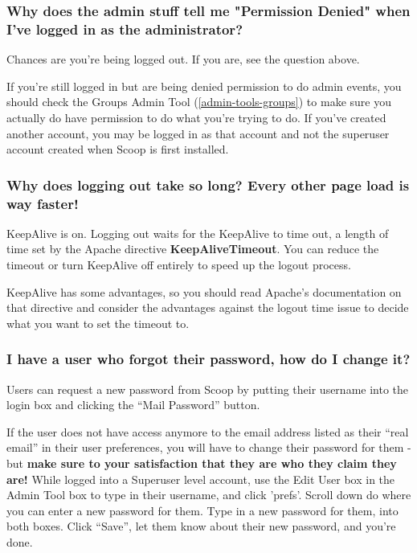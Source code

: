 \subsubsection{Why does the admin stuff tell me "Permission Denied" when I've logged in as the administrator?}

Chances are you're being logged out. If you are, see the question above. 

If you're still logged in but are being denied permission to do admin events, you should check the Groups Admin Tool (\ref{admin-tools-groups}) to make sure you actually do have permission to do what you're trying to do. If you've created another account, you may be logged in as that account and not the superuser account created when Scoop is first installed.

\subsubsection{Why does logging out take so long? Every other page load is way faster!}

KeepAlive is on. Logging out waits for the KeepAlive to time out, a length of time set by the Apache directive {\bf KeepAliveTimeout}. You can reduce the timeout or turn KeepAlive off entirely to speed up the logout process.

KeepAlive has some advantages, so you should read Apache's documentation on that directive and consider the advantages against the logout time issue to decide what you want to set the timeout to.

\subsubsection{I have a user who forgot their password, how do I change it?}

Users can request a new password from Scoop by putting their username into the login box and clicking the ``Mail Password'' button.

If the user does not have access anymore to the email address listed as their ``real email'' in their user preferences, you will have to change their password for them - but {\bf make sure to your satisfaction that they are who they claim they are!} While logged into a Superuser level account, use the Edit User box in the Admin Tool box to type in their username, and click 'prefs'. Scroll down do where you can enter a new password for them. Type in a new password for them, into both boxes. Click ``Save'', let them know about their new password, and you're done.

